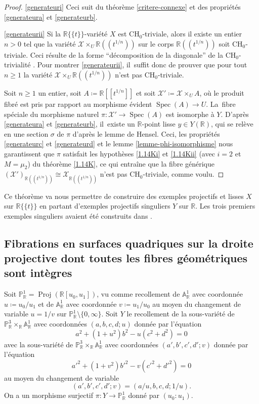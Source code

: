 \documentclass[JEP,XML,SOM,Unicode,francais,published]{cedram}
\let\skpt\skippointrait
\newcommand{\CH}{\mathrm{CH}}
\theoremstyle{definition}
\newcommand{\R}{\mathbb R}
\newcommand{\A}{\mathbb A}
\renewcommand{\P}{\mathbb P}
\newcommand{\Spec}{\operatorname{Spec}}
\newcommand{\mc}[1]{\mathcal{#1}}
\newcommand{\on}[1]{\operatorname{#1}}
\newcommand{\puiseux}{\mathbb{R}\{\!\{t\}\!\}}
\begin{document}
\skpt
\begin{proof}
\eqref{generateuri}
Ceci suit du théorème \ref{critere-connexe} et des propriétés \eqref{generateura} et \eqref{generateurb}.

\eqref{generateurii}
Si la $\puiseux$-variété $X$ est $\CH_0$-triviale,
alors il existe un entier $n>0$ tel que la variété
$\mc{X}\times_U \R(\!(t^{1/n})\!)$ sur le corps $\R(\!(t^{1/n})\!)$
soit $\CH_0$-triviale. Ceci résulte de la forme ``décomposition de la diagonale''
de la $\CH_0$-trivialité \cite[Prop.\,1.4]{colliot2016hypersurfaces}. Pour montrer \eqref{generateurii}, il~suffit donc de prouver que pour tout $n\geq 1$ la variété
$\mc{X}\times_U \R(\!(t^{1/n})\!)$ n'est pas $\CH_0$-triviale.

Soit $n\geq 1$ un entier, soit $A\coloneqq \R[\![t^{1/n}]\!]$ et soit $\mc{X}'\coloneqq \mc{X}\times_U A$, où le produit fibré est pris par rapport au morphisme évident $\Spec(A)\to U$. La~fibre spéciale du morphisme naturel $\pi\colon \mc{X}'\to \Spec(A)$ est isomorphe à $Y$. D'après \eqref{generateura} et \eqref{generateurb}, il~existe un $\R$-point lisse $y\in Y(\R)$, qui se relève en une section $\sigma$ de $\pi$ d'après le lemme de Hensel. Ceci, les propriétés \eqref{generateurc} et \eqref{generateurd} et le lemme \ref{lemme-phi-isomorphisme} nous garantissent que $\pi$ satisfait les hypothèses \eqref{1.14Ki} et \eqref{1.14Kii} (avec $i=2$ et $M=\mu_2$) du théorème \ref{1.14K}, ce qui entraîne que la fibre générique $(\mc{X}')_{\R(\!(t^{1/n})\!)}\cong\mc{X}_{\R(\!(t^{1/n})\!)}$ n'est pas $\CH_0$-triviale, comme voulu.
\end{proof}

Ce théorème va nous permettre de construire des exemples projectifs et lisses $X$ sur $\puiseux$ en partant d'exemples projectifs singuliers $Y$ sur $\R$. Les trois premiers exemples singuliers avaient été construits dans \cite{colliot2024certaines}.

\subsection{Fibrations en surfaces quadriques sur la droite projective dont toutes les fibres géométriques sont intègres}\label{contreexemple}

Soit $\P^1_\R=\on{Proj}(\R[u_0,u_1])$, vu comme recollement de $\A^1_\R$ avec coordonnée $u\coloneqq u_0/u_1$ et de $\A^1_\R$ avec coordonnée $v\coloneqq u_1/u_0$ au moyen du changement de variable $u=1/v$ sur $\P^1_\R\setminus\{0,\infty\}$. Soit $Y$ le recollement de la sous-variété de $\P^3_{\R} \times_{\R} \A^1_{\R}$ avec coordonnées $(a,b,c,d;u)$ donnée par l'équation
\[a^2+(1+u^2) b^2 - u (c^2+d^2)=0\]
avec la sous-variété de $\P^3_{\R} \times_{\R} \A^1_{\R}$ avec coordonnées $(a',b',c',d'; v)$ donnée par l'équation
\[a'^2+(1+v^2)b'^2-v(c'^2+d'^2)=0\]
au moyen du changement de variable
\[(a',b',c',d';v)=(a/u, b, c, d; 1/u).\] On a un morphisme surjectif $\pi\colon Y \to \P^1_\R$ donné par $(u_0:u_1)$.
\end{document}
